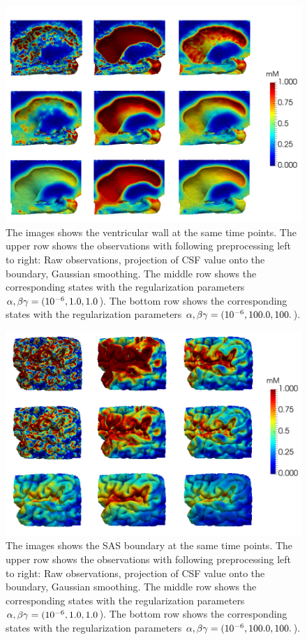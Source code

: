 \documentclass[12pt,a4paper]{article}
\begin{document}
\begin{figure}
\centering
\includegraphics[scale=0.35]{../Vent-2.png} 
\caption{ The images shows the ventricular wall at the same time points. The upper row shows the observations with following preprocessing left to right: Raw observations, projection of CSF value onto the boundary, Gaussian smoothing. The middle row shows the corresponding states with the regularization parameters $\alpha , \beta \gamma = (10\sp{-6},1.0 ,1.0$). The bottom row shows the corresponding states with the regularization parameters $\alpha , \beta \gamma = (10\sp{-6},100.0 ,100.$). }
\label{VENT}
\end{figure}

\begin{figure}
\centering
\includegraphics[scale=0.35]{../SAS-2.png} 
\caption{ The images shows the SAS boundary at the same time points. The upper row shows the observations with following preprocessing left to right: Raw observations, projection of CSF value onto the boundary, Gaussian smoothing. The middle row shows the corresponding states with the regularization parameters $\alpha , \beta \gamma = (10\sp{-6},1.0 ,1.0$). The bottom row shows the corresponding states with the regularization parameters $\alpha , \beta \gamma = (10\sp{-6},100.0 ,100.$). }
\label{SAS}
\end{figure}
\end{document}

